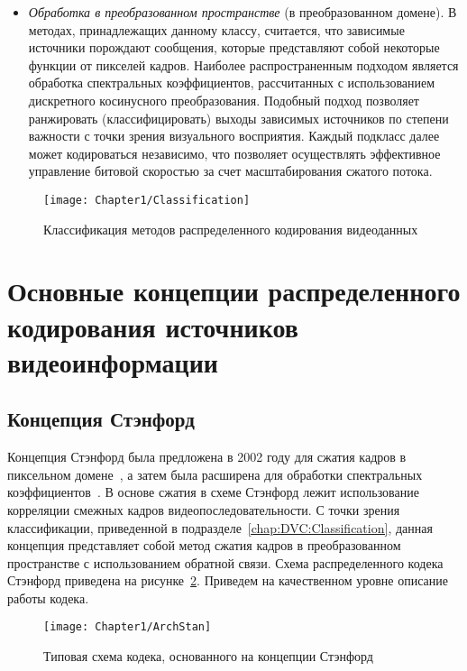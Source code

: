 \begin{itemize}
\begin{itemize}
        \item \emph{Обработка в преобразованном пространстве} (в преобразованном домене). В методах, принадлежащих данному классу, считается, что зависимые источники порождают сообщения, которые представляют собой некоторые функции от пикселей кадров. Наиболее распространенным подходом является обработка спектральных коэффициентов, рассчитанных с использованием дискретного косинусного преобразования. Подобный подход позволяет ранжировать (классифицировать) выходы зависимых источников по степени важности с точки зрения визуального восприятия. Каждый подкласс далее может кодироваться независимо, что позволяет осуществлять эффективное управление битовой скоростью за счет масштабирования сжатого потока. 
    \end{itemize}
\end{itemize}

\begin{figure}[htbp]
    \begin{center}
        \texttt{[image: Chapter1/Classification]}
        \caption{Классификация методов распределенного кодирования видеоданных}
        \label{fig:Classification}
    \end{center}
\end{figure}

\section{Основные концепции распределенного кодирования источников видеоинформации}
\label{chap1:4}

\subsection{Концепция Стэнфорд}
\label{chap:DVC:Arhcs:Stan}

Концепция Стэнфорд была предложена в 2002 году для сжатия кадров в пиксельном домене~\cite{Aaron2002}, а затем была расширена для обработки спектральных коэффициентов~\cite{Aaron2004}. В основе сжатия в схеме Стэнфорд лежит использование корреляции смежных кадров видеопоследовательности. С точки зрения классификации, приведенной в подразделе~\ref{chap:DVC:Classification}, данная концепция представляет собой метод сжатия кадров в преобразованном пространстве с использованием обратной связи. Схема распределенного кодека Стэнфорд приведена на рисунке~\ref{fig:ArchStan}. Приведем на качественном уровне описание работы кодека.

\begin{figure}[htbp]
\begin{center}
\texttt{[image: Chapter1/ArchStan]}
\caption{Типовая схема кодека, основанного на концепции Стэнфорд}
\label{fig:ArchStan}
\end{center}
\end{figure}

